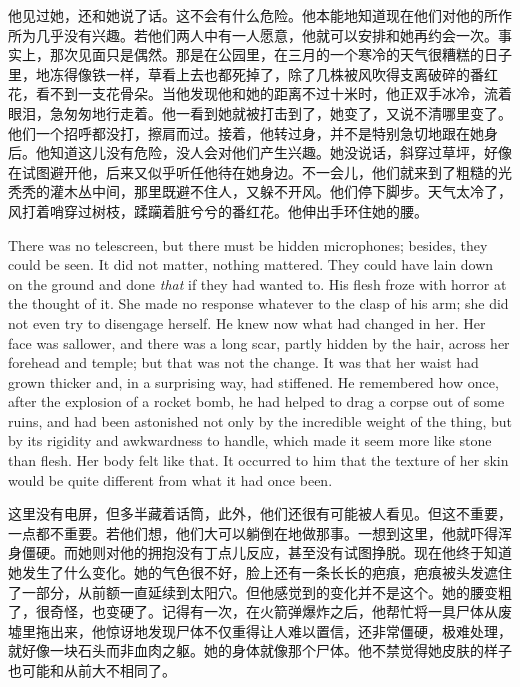 \begin{paracol}{2}
他见过她，还和她说了话。这不会有什么危险。他本能地知道现在他们对他的所作所为几乎没有兴趣。若他们两人中有一人愿意，他就可以安排和她再约会一次。事实上，那次见面只是偶然。那是在公园里，在三月的一个寒冷的天气很糟糕的日子里，地冻得像铁一样，草看上去也都死掉了，除了几株被风吹得支离破碎的番红花，看不到一支花骨朵。当他发现他和她的距离不过十米时，他正双手冰冷，流着眼泪，急匆匆地行走着。他一看到她就被打击到了，她变了，又说不清哪里变了。他们一个招呼都没打，擦肩而过。接着，他转过身，并不是特别急切地跟在她身后。他知道这儿没有危险，没人会对他们产生兴趣。她没说话，斜穿过草坪，好像在试图避开他，后来又似乎听任他待在她身边。不一会儿，他们就来到了粗糙的光秃秃的灌木丛中间，那里既避不住人，又躲不开风。他们停下脚步。天气太冷了，风打着哨穿过树枝，蹂躏着脏兮兮的番红花。他伸出手环住她的腰。

\switchcolumn*

There was no telescreen, but there must be hidden microphones; besides,
they could be seen. It did not matter, nothing mattered. They could have
lain down on the ground and done \emph{that} if they had wanted to. His
flesh froze with horror at the thought of it. She made no response
whatever to the clasp of his arm; she did not even try to disengage
herself. He knew now what had changed in her. Her face was sallower, and
there was a long scar, partly hidden by the hair, across her forehead
and temple; but that was not the change. It was that her waist had grown
thicker and, in a surprising way, had stiffened. He remembered how once,
after the explosion of a rocket bomb, he had helped to drag a corpse out
of some ruins, and had been astonished not only by the incredible weight
of the thing, but by its rigidity and awkwardness to handle, which made
it seem more like stone than flesh. Her body felt like that. It occurred
to him that the texture of her skin would be quite different from what
it had once been.

\switchcolumn

这里没有电屏，但多半藏着话筒，此外，他们还很有可能被人看见。但这不重要，一点都不重要。若他们想，他们大可以躺倒在地做那事。一想到这里，他就吓得浑身僵硬。而她则对他的拥抱没有丁点儿反应，甚至没有试图挣脱。现在他终于知道她发生了什么变化。她的气色很不好，脸上还有一条长长的疤痕，疤痕被头发遮住了一部分，从前额一直延续到太阳穴。但他感觉到的变化并不是这个。她的腰变粗了，很奇怪，也变硬了。记得有一次，在火箭弹爆炸之后，他帮忙将一具尸体从废墟里拖出来，他惊讶地发现尸体不仅重得让人难以置信，还非常僵硬，极难处理，就好像一块石头而非血肉之躯。她的身体就像那个尸体。他不禁觉得她皮肤的样子也可能和从前大不相同了。


\end{paracol}
